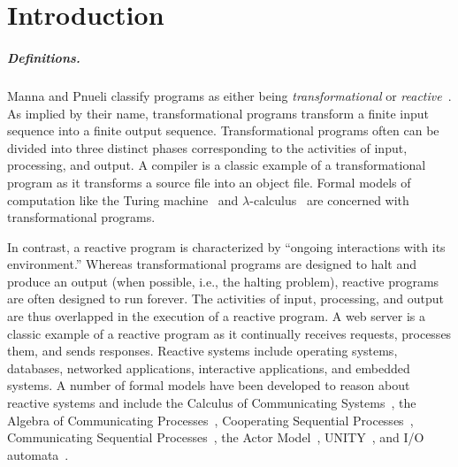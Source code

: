 \chapter{Introduction \label{introduction}}

\paragraph{Definitions.}
Manna and Pnueli classify programs as either being \emph{transformational} or \emph{reactive}~\cite{manna1992temporal}.
As implied by their name, transformational programs transform a finite input sequence into a finite output sequence.
Transformational programs often can be divided into three distinct phases corresponding to the activities of input, processing, and output.
A compiler is a classic example of a transformational program as it transforms a source file into an object file.
Formal models of computation like the Turing machine~\cite{turing1936computable} and $\lambda$-calculus~\cite{church1936unsolvable} are concerned with transformational programs.

In contrast, a reactive program is characterized by ``ongoing interactions with its environment\cite{manna1992temporal}.''
Whereas transformational programs are designed to halt and produce an output (when possible, i.e., the halting problem), reactive programs are often designed to run forever.
The activities of input, processing, and output are thus overlapped in the execution of a reactive program.
A web server is a classic example of a reactive program as it continually receives requests, processes them, and sends responses.
Reactive systems include operating systems, databases, networked applications, interactive applications, and embedded systems.
A number of formal models have been developed to reason about reactive systems and include the Calculus of Communicating Systems~\cite{milner1982calculus}, the Algebra of Communicating Processes~\cite{bergstra1982fixed}, Cooperating Sequential Processes~\cite{dijkstra1965cooperating}, Communicating Sequential Processes~\cite{hoare1978communicating}, the Actor Model~\cite{hewitt1973universal}\cite{clinger1981foundations}\cite{agha1985actors}, UNITY~\cite{chandy1989parallel}, and I/O automata~\cite{nancy1996distributed}.

